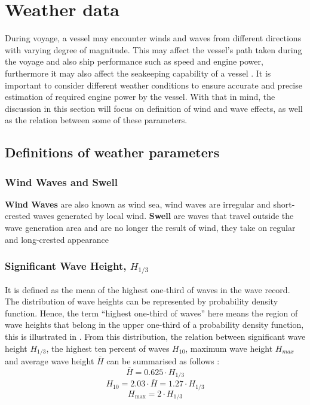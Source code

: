 \section{Weather data}\label{sec:weather_theo}

During voyage, a vessel may encounter winds and waves from different directions with varying degree of magnitude. This may affect the vessel's path taken during the voyage and also ship performance such as speed and engine power, furthermore it may also affect the seakeeping capability of a vessel . It is important to consider different weather conditions to ensure accurate and precise estimation of required engine power by the vessel. With that in mind, the discussion in this section will focus on definition of wind and wave effects, as well as the relation between some of these parameters. \\  

\subsection{Definitions of weather parameters}\label{sec:weather_definition}

\subsubsection*{Wind Waves and Swell}

\textbf{Wind Waves} are also known as wind sea, wind waves are irregular and short-crested waves generated by local wind. \textbf{Swell} are waves that travel outside the wave generation area and are no longer the result of wind, they take on regular and long-crested appearance 

\subsubsection*{Significant Wave Height, $H_{1/3}$}

It is defined as the mean of the highest one-third of waves in the wave record. The distribution of wave heights can be represented by probability density function. Hence, the term ``highest one-third of waves'' here means the region of wave heights that belong in the upper one-third of a probability density function, this is illustrated in . From this distribution, the relation between significant wave height $H_{1/3}$, the highest ten percent of waves $H_{10}$, maximum wave height $H_{max}$ and average wave height $\overline{H}$ can be summarised as follows : 
\begin{equation}\label{eqn:Hsig_mean}
    \overline{H} = 0.625\cdot H_{1/3}
\end{equation}
\begin{equation}\label{eqn:Hsig_Hten}
    H_{10} = 2.03\cdot \overline{H} = 1.27\cdot H_{1/3} 
\end{equation}
\begin{equation}\label{eqn:Hsig_max}
    H_{\text{max}} = 2 \cdot H_{1/3} 
\end{equation} 

